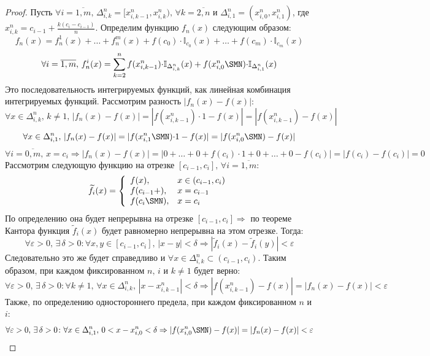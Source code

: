 \documentclass[12pt]{article}
\newcommand{\VE}{\varepsilon}
\theoremstyle{definition}
\begin{document}
\begin{proof}
	Пусть $\forall i = \overline{1,m},\, \Delta_{i,k}^n = [x_{i,k-1}^n, x_{i,k}^n), \,  \forall k = \overline{2,n}$ и $\Delta_{i,1}^n = (x_{i,0}^n, x_{i,1}^n)$, где $x_{i,k}^n = c_{i-1} + \tfrac{k(c_i - c_{i-1})}{n}$. Определим функцию $f_n(x)$ следующим образом:
	$$
		f_n(x) = f_n^1(x) + \dotsc + f_n^m(x) + f(c_0){\cdot}\mathbb{I}_{c_0}(x) + \dotsc + f(c_m){\cdot}\mathbb{I}_{c_m}(x) 
	$$
	$$
		\forall i = \overline{1,m}, \, f_n^i(x) = \displaystyle \sum\limits_{k = 2}^n f(x_{i,k-1}^n){\cdot}\mathbb{I}_{\Delta_{i,k}^n}(x) + f(x_{i,0}^n\SMN){\cdot}\mathbb{I}_{\Delta_{i,1}^n}(x)
	$$
	Это последовательность интегрируемых функций, как линейная комбинация интегрируемых функций. Рассмотрим разность $|f_n(x) - f(x)|$:
	$$
		\forall x \in \Delta_{i,k}^n, \, k \neq 1, \, |f_n(x) - f(x)| = |f(x_{i,k-1}^n){\cdot}1 - f(x)| = |f(x_{i,k-1}^n) - f(x)|
	$$
	$$
		\forall x \in \Delta_{i,1}^n, \, |f_n(x) - f(x)| = |f(x_{i,1}^n\SMN){\cdot}1 - f(x)| = |f(x_{i,0}^n\SMN) - f(x)|
	$$
	$$
		\forall i = \overline{0,m}, \, x = c_i \Rightarrow |f_n(x) - f(x)| = |0 + \dotsc + 0 + f(c_i){\cdot}1 + 0 + \dotsc + 0 - f(c_i)| = |f(c_i) - f(c_i)| = 0 
	$$
	Рассмотрим следующую функцию на отрезке $[c_{i-1},c_i], \, \forall i = \overline{1,m}$:
	$$
		\widetilde{f}_i(x) = 
		\left\{
			\begin{array}{ll}
				f(x), & x \in (c_{i-1},c_i) \\
				f(c_{i-1}+), & x = c_{i-1} \\
				f(c_i \SMN), &  x = c_i  
			\end{array}
		\right.
	$$
	По определению она будет непрерывна на отрезке $[c_{i-1},c_i] \Rightarrow$ по теореме Кантора функция $\widetilde{f}_i(x)$ будет равномерно непрерывна на этом отрезке. Тогда:
	$$
		\forall \VE > 0, \, \exists \, \delta > 0 \colon \forall x,y \in [c_{i-1},c_i],\, |x - y| < \delta \Rightarrow \left|\widetilde{f}_i(x) - \widetilde{f}_i(y)\right| < \VE 
	$$
	Следовательно это же будет справедливо и $\forall x \in \Delta_{i,k}^n \subset (c_{i-1},c_i)$. Таким образом, при каждом фиксированном $n, \, i$ и $k \neq 1$ будет верно:
	$$
		\forall \VE > 0, \, \exists \, \delta > 0 \colon \forall k \neq 1, \, \forall x \in \Delta_{i,k}^n, \, |x - x_{i,k-1}^n| < \delta \Rightarrow |f(x_{i,k-1}^n) - f(x)| = |f_n(x) - f(x)| < \VE
	$$
	Также, по определению одностороннего предела, при каждом фиксированном $n$ и $i$:
	$$
		\forall \VE > 0, \, \exists \, \delta > 0 \colon \forall x \in \Delta_{i,1}^n, \, 0 < x - x_{i,0}^n < \delta \Rightarrow |f(x_{i,0}^n\SMN) - f(x)| = |f_n(x) - f(x)| < \VE
$$
\end{proof}
\end{document}
